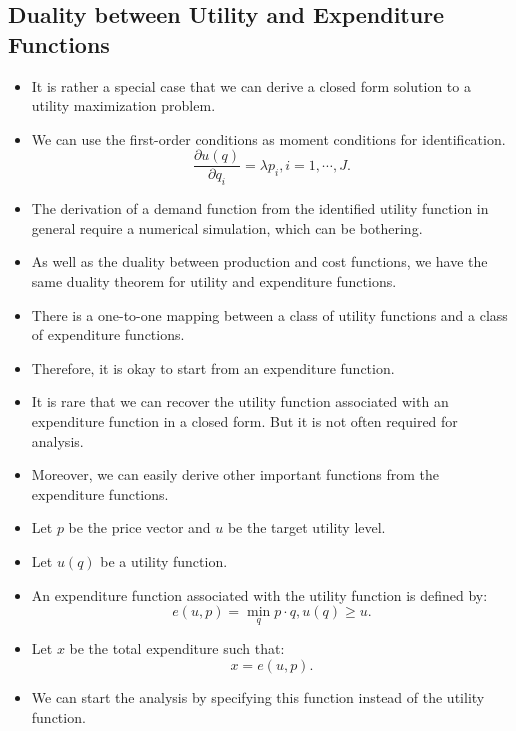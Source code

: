\documentclass[
]{book}
\providecommand{\tightlist}{%
  \setlength{\itemsep}{0pt}\setlength{\parskip}{0pt}}
\begin{document}
\hypertarget{duality-between-utility-and-expenditure-functions}{%
\subsection{Duality between Utility and Expenditure Functions}\label{duality-between-utility-and-expenditure-functions}}

\begin{itemize}
\tightlist
\item
  It is rather a special case that we can derive a closed form solution to a utility maximization problem.
\item
  We can use the first-order conditions as moment conditions for identification.
  \begin{equation}
  \frac{\partial u(q)}{\partial q_i} = \lambda p_i, i = 1, \cdots, J.
  \end{equation}
\item
  The derivation of a demand function from the identified utility function in general require a numerical simulation, which can be bothering.
\item
  As well as the duality between production and cost functions, we have the same duality theorem for utility and expenditure functions.
\item
  There is a one-to-one mapping between a class of utility functions and a class of expenditure functions.
\item
  Therefore, it is okay to start from an expenditure function.
\item
  It is rare that we can recover the utility function associated with an expenditure function in a closed form. But it is not often required for analysis.
\item
  Moreover, we can easily derive other important functions from the expenditure functions.
\item
  Let \(p\) be the price vector and \(u\) be the target utility level.
\item
  Let \(u(q)\) be a utility function.
\item
  An expenditure function associated with the utility function is defined by:
  \begin{equation}
  e(u, p) = \min_{q} p \cdot q, u(q) \ge u.
  \end{equation}
\item
  Let \(x\) be the total expenditure such that:
  \begin{equation}
  x = e(u, p).
  \end{equation}
\item
  We can start the analysis by specifying this function instead of the utility function.
\end{itemize}
\end{document}
